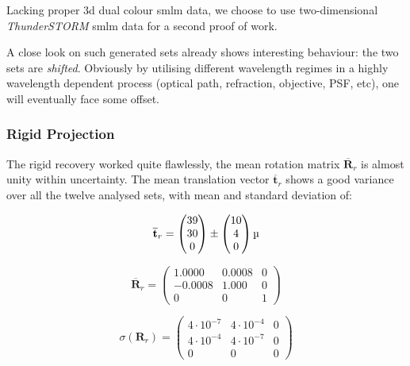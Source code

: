 \documentclass[11pt, a4paper, oneside, twocolumn]{report}
\renewcommand{\b}{\textbf}
\newcommand{\e}{\emph}
\newcommand{\m}{\mathrm}
\begin{document}
Lacking proper 3d dual colour \gls{smlm} data, we choose to use
two-dimensional \e{ThunderSTORM} \gls{smlm} data for a second proof of
work.

A close look on such generated sets already shows interesting
behaviour: the two sets are \e{shifted}. Obviously by utilising
different wavelength regimes in a highly wavelength dependent process
(optical path, refraction, objective, PSF, etc), one will eventually
face some offset.


\subsubsection{Rigid Projection}\label{s:r:dcnpcr}

The rigid recovery worked quite flawlessly, the mean rotation matrix
$\overline{\b{R}}_r$ is almost unity within uncertainty. The mean
translation vector $\overline{\b{t}}_r$ shows a good variance over all
the twelve analysed sets, with mean and standard deviation of:

\begin{equation}
  \overline{\b{t}}_r=
  \begin{pmatrix}
    39 \\
    30 \\
    0 \\
  \end{pmatrix}
  \pm
  \begin{pmatrix}
    10 \\
    4 \\
    0 \\
  \end{pmatrix}
  \si{\micro\m}
\end{equation}

\begin{equation}
  \overline{\b{R}}_r =
  \begin{pmatrix}
    1.0000 & 0.0008 & 0 \\
    -0.0008 & 1.000 & 0 \\
    0 & 0 & 1
  \end{pmatrix}
\end{equation}

\begin{equation}
  \sigma( \b{R}_r ) =
  \begin{pmatrix}
    4\cdot10^{-7} & 4\cdot10^{-4} & 0 \\
    4\cdot10^{-4} & 4\cdot10^{-7} & 0 \\
    0 & 0 & 0
  \end{pmatrix}
\end{equation}
\end{document}
